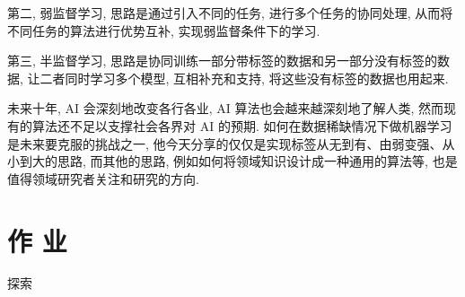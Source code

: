 第二, 弱监督学习, 思路是通过引入不同的任务, 进行多个任务的协同处理, 从而将不同任务的算法进行优势互补, 实现弱监督条件下的学习.

第三, 半监督学习, 思路是协同训练一部分带标签的数据和另一部分没有标签的数据, 让二者同时学习多个模型, 互相补充和支持, 将这些没有标签的数据也用起来.

未来十年, AI 会深刻地改变各行各业, AI 算法也会越来越深刻地了解人类, 然而现有的算法还不足以支撑社会各界对 AI 的预期. 如何在数据稀缺情况下做机器学习是未来要克服的挑战之一, 他今天分享的仅仅是实现标签从无到有、由弱变强、从小到大的思路, 而其他的思路, 例如如何将领域知识设计成一种通用的算法等, 也是值得领域研究者关注和研究的方向.

\section{作 业 }
\begin{custom}[explorecolor]{探索}

\end{custom}

\begin{think}

\end{think} 
